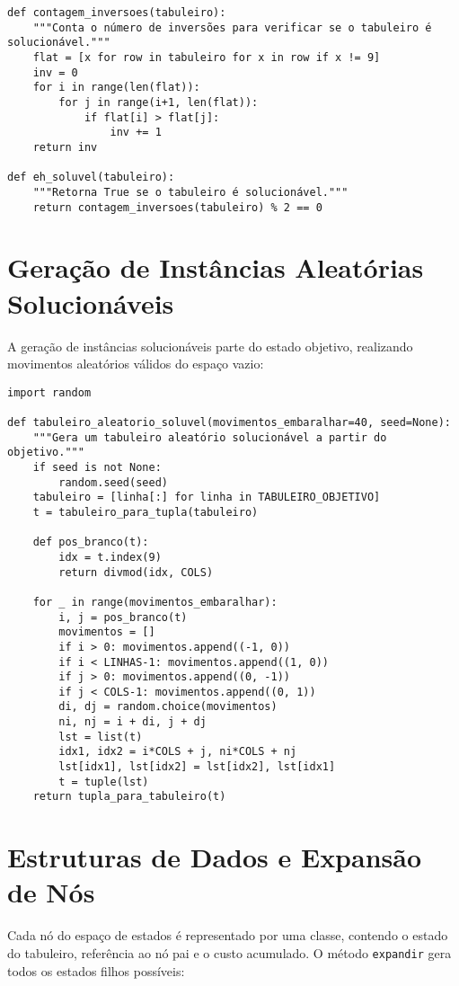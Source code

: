 \begin{verbatim}  
def contagem_inversoes(tabuleiro):  
    """Conta o número de inversões para verificar se o tabuleiro é solucionável."""  
    flat = [x for row in tabuleiro for x in row if x != 9]  
    inv = 0  
    for i in range(len(flat)):  
        for j in range(i+1, len(flat)):  
            if flat[i] > flat[j]:  
                inv += 1  
    return inv  

def eh_soluvel(tabuleiro):  
    """Retorna True se o tabuleiro é solucionável."""  
    return contagem_inversoes(tabuleiro) % 2 == 0  
\end{verbatim}  

\section{Geração de Instâncias Aleatórias Solucionáveis}  
A geração de instâncias solucionáveis parte do estado objetivo, realizando movimentos aleatórios válidos do espaço vazio:  

\begin{verbatim}  
import random  

def tabuleiro_aleatorio_soluvel(movimentos_embaralhar=40, seed=None):  
    """Gera um tabuleiro aleatório solucionável a partir do objetivo."""  
    if seed is not None:  
        random.seed(seed)  
    tabuleiro = [linha[:] for linha in TABULEIRO_OBJETIVO]  
    t = tabuleiro_para_tupla(tabuleiro)  

    def pos_branco(t):  
        idx = t.index(9)  
        return divmod(idx, COLS)  

    for _ in range(movimentos_embaralhar):  
        i, j = pos_branco(t)  
        movimentos = []  
        if i > 0: movimentos.append((-1, 0))  
        if i < LINHAS-1: movimentos.append((1, 0))  
        if j > 0: movimentos.append((0, -1))  
        if j < COLS-1: movimentos.append((0, 1))  
        di, dj = random.choice(movimentos)  
        ni, nj = i + di, j + dj  
        lst = list(t)  
        idx1, idx2 = i*COLS + j, ni*COLS + nj  
        lst[idx1], lst[idx2] = lst[idx2], lst[idx1]  
        t = tuple(lst)  
    return tupla_para_tabuleiro(t)  
\end{verbatim}  

\section{Estruturas de Dados e Expansão de Nós}  
Cada nó do espaço de estados é representado por uma classe, contendo o estado do tabuleiro, referência ao nó pai e o custo acumulado. O método \texttt{expandir} gera todos os estados filhos possíveis:  


